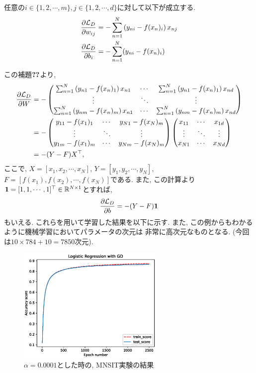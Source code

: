 \begin{Lem}\label{test}
    任意の$i\in\{1, 2, \cdots, m\}, j\in\{1, 2, \cdots, d\}$に対して以下が成立する.
    \begin{align*}
        \frac{\partial\mathcal{L}_{D}}{\partial w_{ij}} &= -\sum_{n = 1}^{N}\left(y_{ni} - f(x_{n})_{i}\right)x_{nj}\\
        \frac{\partial\mathcal{L}_{D}}{\partial b_{i}} &= -\sum_{n = 1}^{N}(y_{ni} - f(x_{n})_{i})
    \end{align*}
\end{Lem}
この補題$\Ref{test}$より, 
\begin{align*}
    \frac{\partial\mathcal{L}_{D}}{\partial W} &= - 
    \begin{pmatrix}
        \sum_{n = 1}^{N}\left(y_{n1} - f(x_{n})_{1}\right)x_{n1} & \cdots & \sum_{n = 1}^{N}\left(y_{n1} - f(x_{n})_{1}\right)x_{nd}\\
        \vdots & \ddots & \vdots\\
        \sum_{n = 1}^{N}\left(y_{nm} - f(x_{n})_{m}\right)x_{n1} & \cdots & \sum_{n = 1}^{N}\left(y_{nm} - f(x_{n})_{m}\right)x_{nd}
    \end{pmatrix}\\ 
    & = - 
    \begin{pmatrix}
        y_{11} - f(x_1)_1 & \cdots & y_{N1} - f(x_N)_m\\
        \vdots & \ddots & \vdots\\
        y_{1m} - f(x_1)_m & \cdots & y_{Nm} - f(x_N)_m
    \end{pmatrix}
    \begin{pmatrix}
        x_{11} & \cdots & x_{1d} \\
        \vdots & \ddots & \vdots \\
        x_{N1} & \cdots & x_{Nd}
    \end{pmatrix}\\
    &= -(Y - F)X^{\top},
\end{align*}
ここで, $X = [x_{1}, x_{2}, \cdots, x_{N}]$, $Y = [y_1, y_2, \cdots, y_N]$, $F = [f(x_1), f(x_2), \cdots, f(x_N)]$である. 
また, この計算より$\mathbf{1} = [1, 1, \cdots, 1]^{\top}\in\mathbb{R}^{N\times 1}$とすれば,
\begin{align*}
    \frac{\partial\mathcal{L}_{D}}{\partial b} = -(Y - F)\mathbf{1}
\end{align*}
もいえる. これらを用いて学習した結果を以下に示す. また, この例からもわかるように機械学習においてパラメータの次元は
非常に高次元なものとなる. (今回は$10\times784 + 10 = 7850$次元).
\begin{figure}[H]
    \centering
    \includegraphics[width = 7.0cm]{Images/MNIST_Experiment.eps}
    \caption{$\alpha = 0.0001$とした時の, MNSIT実験の結果}
\end{figure}

